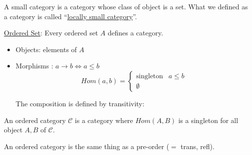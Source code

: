 \documentclass{article}
\theoremstyle{plain}
\begin{document}
   A small category is a category whose class of object is a set.
  What we defined as a category is called ``\underline{locally small category}''.

  \ex

  \underline{Ordered Set}: Every ordered set $A$ defines a category.
    \begin{itemize}
      \item Objects: elements of $A$
      \item Morphisms : $a \to b \Leftrightarrow a \leq b$
        \[ Hom(a, b) =
          \begin{cases}
            \text{singleton} & a \leq b \\
            \emptyset
          \end{cases} \]

      The composition is defined by transitivity:

        \begin{center}
        \end{center}
    \end{itemize}

     An ordered category $\mathcal C$ is a category where $Hom(A,B)$ is a
    singleton for all object $A, B $ of $\mathcal C$.

    \obs An ordered category is the same thing as a pre-order ($=$ trans, refl).
\end{document}
